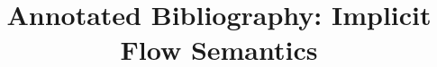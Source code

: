 \documentclass{article}
\begin{document}
	\title{Annotated Bibliography: Implicit Flow Semantics}
	\author{}
	\maketitle\nocite{*}
	
	
\end{document}
